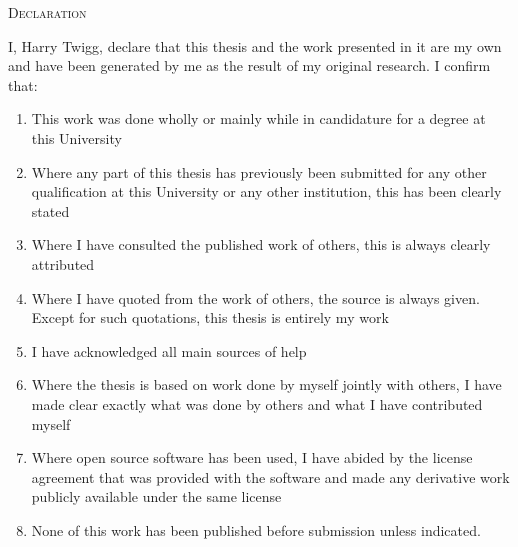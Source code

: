 \begin{center}
    \textsc{Declaration}
\end{center}

I, Harry Twigg, declare that this thesis and the work presented in it are my own and have been generated by me as the result of my original research. I confirm that:

\begin{enumerate}
    \item This work was done wholly or mainly while in candidature for a degree at this University
    \item Where any part of this thesis has previously been submitted for any other qualification at this 
    University or any other institution, this has been clearly stated
    \item Where I have consulted the published work of others, this is always clearly attributed
    \item Where I have quoted from the work of others, the source is always given. Except for such
    quotations, this thesis is entirely my work
    \item I have acknowledged all main sources of help
    \item Where the thesis is based on work done by myself jointly with others, I have made clear exactly what 
    was done by others and what I have contributed myself
    \item Where open source software has been used, I have abided by the license agreement that was provided with the software and made any derivative work publicly available under the same license
    \item None of this work has been published before submission unless indicated.
\end{enumerate}
